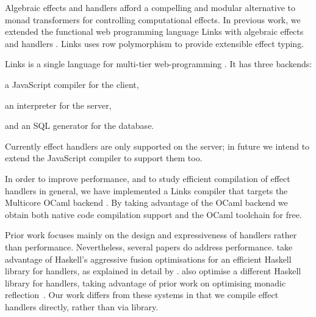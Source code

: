 \documentclass[preprint,numbers]{sigplanconf}
\newcommand{\msgbox}[2]{{%
  \par\noindent\small\color{red}%
  \framebox{\parbox{\dimexpr\linewidth-2\fboxsep-2\fboxrule}{\textbf{#1:} #2}}%
}}
\newcommand{\kc}[1]{\msgbox{KC}{#1}}
\begin{document}
Algebraic effects and handlers \cite{Plotkin2013} afford a compelling
and modular alternative to monad transformers for controlling
computational effects. In previous work, we extended the functional
web programming language Links with algebraic effects and handlers
\cite{Hillerstrom2015,Hillerstrom2016}. Links uses row polymorphism to
provide extensible effect typing.

Links is a single language for multi-tier web-programming
\cite{Cooper2006}. It has three backends:
\begin{enumerate*}[label={\roman*)}]
 \item a JavaScript compiler for the client,
 \item an interpreter for the server,
 \item and an SQL generator for the database.
\end{enumerate*}
Currently effect handlers are only supported on the server; in future
we intend to extend the JavaScript compiler to support them too.

In order to improve performance, and to study efficient compilation of effect
handlers in general, we have implemented a Links compiler that targets the
Multicore OCaml backend \cite{Dolan2015}. By taking advantage of the OCaml
backend we obtain both native code compilation support and the OCaml toolchain
for free.


Prior work focuses mainly on the design and expressiveness of handlers
rather than performance. Nevertheless, several papers do address
performance. \citet{Kammar2013} take advantage of Haskell's aggressive
fusion optimisations for an efficient Haskell library for handlers, as
explained in detail by \citet{Wu2015}. \citet{Kiselyov2015} also
optimise a different Haskell library for handlers, taking advantage of
prior work on optimising monadic reflection~\citep{PloegK14}. Our work
differs from these systems in that we compile effect handlers
directly, rather than via library.


\end{document}

